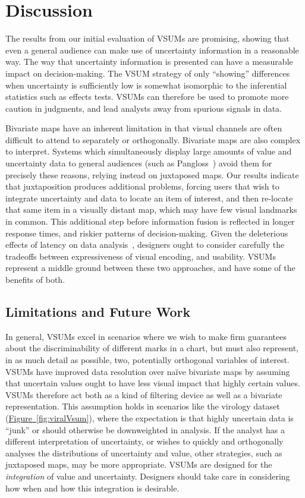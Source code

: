 \documentclass{vgtc}                          %
\newcommand{\figref}[1]{\hyperref[#1]{Figure~\ref*{#1}}}
\begin{document}
\section{Discussion}

The results from our initial evaluation of VSUMs are promising, showing that even a general audience can make use of uncertainty information in a reasonable way. The way that uncertainty information is presented can have a measurable impact on decision-making. The VSUM strategy of only ``showing'' differences when uncertainty is sufficiently low is somewhat isomorphic to the inferential statistics such as effects tests. VSUMs can therefore be used to promote more caution in judgments, and lead analysts away from spurious signals in data.

Bivariate maps have an inherent limitation in that visual channels are often difficult to attend to separately or orthogonally. Bivariate maps are also complex to interpret. Systems which simultaneously display large amounts of value and uncertainty data to general audiences (such as Pangloss~\cite{moritz2017trust}) avoid them for precisely these reasons, relying instead on juxtaposed maps. Our results indicate that juxtaposition produces additional problems, forcing users that wish to integrate uncertainty and data to locate an item of interest, and then re-locate that same item in a visually distant map, which may have few visual landmarks in common. This additional step before information fusion is reflected in longer response times, and riskier patterns of decision-making. Given the deleterious effects of latency on data analysis~\cite{liu2014effects}, designers ought to consider carefully the tradeoffs between expressiveness of visual encoding, and usability. VSUMs represent a middle ground between these two approaches, and have some of the benefits of both.

\subsection{Limitations and Future Work}
In general, VSUMs excel in scenarios where we wish to make firm guarantees about the discriminability of different marks in a chart, but must also represent, in as much detail as possible, two, potentially orthogonal variables of interest. VSUMs have improved data resolution over na\"ive bivariate maps by assuming that uncertain values ought to have less visual impact that highly certain values. VSUMs therefore act both as a kind of filtering device as well as a bivariate representation. This assumption holds in scenarios like the virology dataset (\figref{fig:viralVsum}), where the expectation is that highly uncertain data is ``junk'' or should otherwise be downweighted in analysis. If the analyst has a different interpretation of uncertainty, or wishes to quickly and orthogonally analyses the distributions of uncertainty and value, other strategies, such as juxtaposed maps, may be more appropriate. VSUMs are designed for the \emph{integration} of value and uncertainty. Designers should take care in considering how when and how this integration is desirable.
\end{document}
